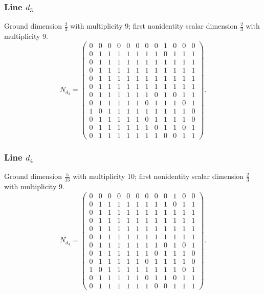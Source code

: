 \subsubsection*{Line $d_{3}$}
\noindent Ground dimension $\frac{2}{3}$ with multiplicity 9; first nonidentity scalar dimension $\frac{2}{3}$ with multiplicity 9.
\[\renewcommand{\arraystretch}{0.93}N_{d_{3}}=\left(\begin{array}{rrrrrrrrrrrr}
0&0&0&0&0&0&0&0&1&0&0&0\\
0&1&1&1&1&1&1&1&0&1&1&1\\
0&1&1&1&1&1&1&1&1&1&1&1\\
0&1&1&1&1&1&1&1&1&1&1&1\\
0&1&1&1&1&1&1&1&1&1&1&1\\
0&1&1&1&1&1&1&1&1&1&1&1\\
0&1&1&1&1&1&1&0&1&0&1&1\\
0&1&1&1&1&1&0&1&1&1&0&1\\
1&0&1&1&1&1&1&1&1&1&1&0\\
0&1&1&1&1&1&0&1&1&1&1&0\\
0&1&1&1&1&1&1&0&1&1&0&1\\
0&1&1&1&1&1&1&1&0&0&1&1
\end{array}\right).\]
\subsubsection*{Line $d_{4}$}
\noindent Ground dimension $\frac{5}{13}$ with multiplicity 10; first nonidentity scalar dimension $\frac{2}{3}$ with multiplicity 9.
\[\renewcommand{\arraystretch}{0.93}N_{d_{4}}=\left(\begin{array}{rrrrrrrrrrrr}
0&0&0&0&0&0&0&0&0&1&0&0\\
0&1&1&1&1&1&1&1&1&0&1&1\\
0&1&1&1&1&1&1&1&1&1&1&1\\
0&1&1&1&1&1&1&1&1&1&1&1\\
0&1&1&1&1&1&1&1&1&1&1&1\\
0&1&1&1&1&1&1&1&1&1&1&1\\
0&1&1&1&1&1&1&1&0&1&0&1\\
0&1&1&1&1&1&1&0&1&1&1&0\\
0&1&1&1&1&1&0&1&1&1&1&0\\
1&0&1&1&1&1&1&1&1&1&0&1\\
0&1&1&1&1&1&0&1&1&0&1&1\\
0&1&1&1&1&1&1&0&0&1&1&1
\end{array}\right).\]

